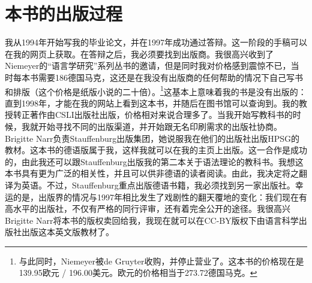 \section*{本书的出版过程}

我从1994年开始写我的毕业论文，并在1997年成功通过答辩。这一阶段的手稿可以在我的网页上获取。在答辩之后，我必须要找到出版商。我很高兴收到了Niemeyer的“语言学研究”系列丛书的邀请，但是同时我对价格感到震惊不已，当时每本书需要186德国马克，这还是在我没有出版商的任何帮助的情况下自己写书和排版（这个价格是纸版小说的二十倍）。\footnote{%
与此同时，Niemeyer被de Gruyter收购，并停止营业了。这本书的价格现在是139.95欧元 / 196.00美元。欧元的价格相当于273.72德国马克。
}这基本上意味着我的书是没有出版的：直到1998年，才能在我的网站上看到这本书，并随后在图书馆可以查询到。我的教授转正著作由CSLI出版社出版，价格相对来说合理多了。当我开始写教科书的时候，我就开始寻找不同的出版渠道，并开始跟无名印刷需求的出版社协商。Brigitte Narr负责Stauffenburg出版集团，她说服我在他们的出版社出版HPSG的教材。这本书的德语版属于我，这样我就可以在我的主页上出版。这一合作是成功的，由此我还可以跟Stauffenburg出版我的第二本关于语法理论的教科书。我想这本书具有更为广泛的相关性，并且可以供非德语的读者阅读。由此，我决定将之翻译为英语。不过，Stauffenburg重点出版德语书籍，我必须找到另一家出版社。幸运的是，出版界的情况与1997年相比发生了戏剧性的翻天覆地的变化：我们现在有高水平的出版社，不仅有严格的同行评审，还有着完全公开的途径。我很高兴Brigitte Narr将本书的版权卖回给我，我现在就可以在CC-BY版权下由语言科学出版社出版这本英文版教材了。
